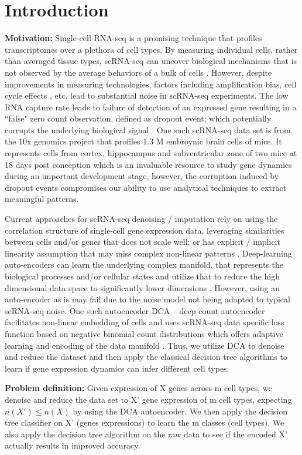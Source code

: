 \section*{Introduction}

\textbf{Motivation:} Single-cell RNA-seq is a promising technique that profiles transcriptomes over a plethora of cell types. By measuring individual cells, rather than averaged tissue types, scRNA-seq can uncover biological mechanisms that is not observed by the average behaviors of a bulk of cells  \citep{wang2017vasc}. However, despite improvements in measuring technologies, factors including amplification bias, cell cycle effects \citep{buettner2015computational}, etc. lead to substantial noise in scRNA-seq experiments. The low RNA capture rate leads to failure of detection of an expressed gene resulting in a ``false" zero count observation, defined as dropout event; which potentially corrupts the underlying biological signal \cite{eraslan2018single}. One such scRNA-seq data set is from the 10x genomics project that  profiles 1.3 M embroynic brain cells of mice. It represents cells from cortex, hippocampus and subventricular zone of two mice at 18 days post conception which is an invaluable resource to study gene dynamics during an important development stage, however, the corruption induced by dropout events compromises our ability to use analytical techniques to extract meaningful patterns. 

Current approaches for scRNA-seq denoising / imputation rely on using the correlation structure of single-cell gene expression data, leveraging similarities between cells and/or genes that does not scale well; or has explicit / implicit linearity assumption that may miss complex non-linear patterns \citep{eraslan2018single}. Deep-learning auto-encoders can learn the underlying complex manifold, that represents the biological processes and/or cellular states and utilize that to reduce the high dimensional data space to significantly lower dimensions \citep{moon2017manifold}. However, using an auto-encoder as is may fail due to the noise model not being adapted to typical scRNA-seq noise. One such autoencoder DCA -- deep count autoencoder facilitates non-linear embedding of cells and uses scRNA-seq data specific loss function based on negative binomial count distributions which offers adaptive learning and encoding of the data manifold \citep{eraslan2018single}. Thus, we utilize DCA to denoise and reduce the dataset and then apply the classical decision tree algorithms to learn if gene expression dynamics can infer different cell types.

\textbf{Problem definition:} Given expression of X genes across m cell types, we denoise and reduce the data set to X' gene expression of m cell types, expecting $n(X') \leq n(X)$ by using the DCA autoencoder. We then apply the decision tree classifier on X' (genes expressions) to learn the m classes (cell types). We also apply the decision tree algorithm on the raw data to see if the encoded X' actually results in improved accuracy.
